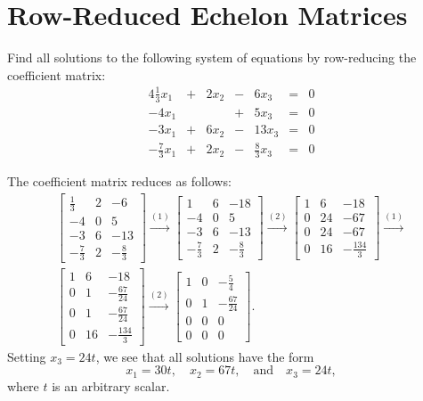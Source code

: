\section{Row-Reduced Echelon Matrices}

 Find all solutions to the following system of equations by
row-reducing the coefficient matrix:
\begin{alignat*}{4}
  \tfrac13x_1 &{}+{}& 2x_2 &{}-{}& 6x_3 &{}={}& 0 \\
  -4x_1 && &{}+{}& 5x_3 &{}={}& 0 \\
  -3x_1 &{}+{}& 6x_2 &{}-{}& 13x_3 &{}={}& 0 \\
  -\tfrac73x_1 &{}+{}& 2x_2 &{}-{}& \tfrac83x_3 &{}={}& 0
\end{alignat*}
\begin{solution}
  The coefficient matrix reduces as follows:
  \begin{gather*}
    \begin{bmatrix}
      \frac13 & 2 & -6 \\[3pt]
      -4 & 0 & 5 \\[3pt]
      -3 & 6 & -13 \\[3pt]
      -\frac73 & 2 & -\frac83
    \end{bmatrix}
    \xrightarrow{(1)}
    \begin{bmatrix}
      1 & 6 & -18 \\[3pt]
      -4 & 0 & 5 \\[3pt]
      -3 & 6 & -13 \\[3pt]
      -\frac73 & 2 & -\frac83
    \end{bmatrix}
    \xrightarrow{(2)}
    \begin{bmatrix}
      1 & 6 & -18 \\[3pt]
      0 & 24 & -67 \\[3pt]
      0 & 24 & -67 \\[3pt]
      0 & 16 & -\frac{134}3
    \end{bmatrix}
    \xrightarrow{(1)} \\
    \begin{bmatrix}
      1 & 6 & -18 \\[3pt]
      0 & 1 & -\frac{67}{24} \\[3pt]
      0 & 1 & -\frac{67}{24} \\[3pt]
      0 & 16 & -\frac{134}3
    \end{bmatrix}
    \xrightarrow{(2)}
    \begin{bmatrix}
      1 & 0 & -\frac54 \\[3pt]
      0 & 1 & -\frac{67}{24} \\[3pt]
      0 & 0 & 0 \\[3pt]
      0 & 0 & 0
    \end{bmatrix}.
  \end{gather*}
  Setting $x_3 = 24t$, we see that all solutions have the form
  \begin{equation*}
    x_1 = 30t,
    \quad
    x_2 = 67t,
    \quad\text{and}\quad
    x_3 = 24t,
  \end{equation*}
  where $t$ is an arbitrary scalar.
\end{solution}
